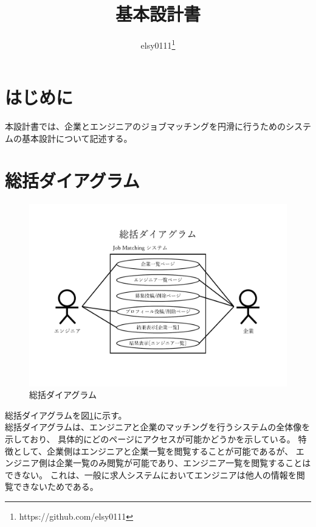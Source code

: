 \documentclass[10pt]{ltjsarticle}
\begin{document}
\title{基本設計書}
\author{elsy0111\footnote{https://github.com/elsy0111}}
\maketitle

\section{はじめに}
本設計書では、企業とエンジニアのジョブマッチングを円滑に行うためのシステムの基本設計について記述する。

\section{総括ダイアグラム}
\begin{figure}[H]
    \centering
    \includegraphics[trim=3cm 3.5cm 3cm 4.7cm, clip, width=14cm]{./img/diagram.pdf}  %
    \caption{総括ダイアグラム}
    \label{fig:diagram}
\end{figure}
\vspace{-.5cm}

総括ダイアグラムを図\ref{fig:diagram}に示す。\\
\indent 総括ダイアグラムは、エンジニアと企業のマッチングを行うシステムの全体像を示しており、
具体的にどのページにアクセスが可能かどうかを示している。
特徴として、企業側はエンジニアと企業一覧を閲覧することが可能であるが、
エンジニア側は企業一覧のみ閲覧が可能であり、エンジニア一覧を閲覧することはできない。
これは、一般に求人システムにおいてエンジニアは他人の情報を閲覧できないためである。

\newpage
\end{document}
